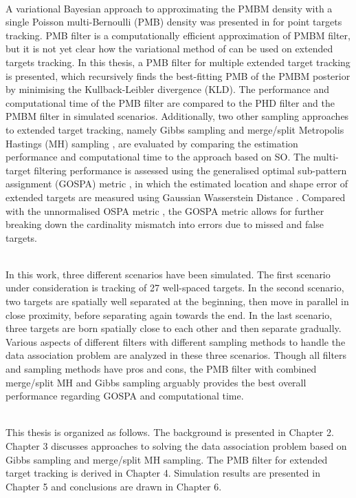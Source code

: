 ~\\
A variational Bayesian approach to approximating the PMBM density with a single Poisson multi-Bernoulli (PMB) density was presented in \cite{variational} for point targets tracking. PMB filter is a computationally efficient approximation of PMBM filter, but it is not yet clear how the variational method of \cite{variational} can be used on extended targets tracking. In this thesis, a PMB filter for multiple extended target tracking is presented, which recursively finds the best-fitting PMB of the PMBM posterior by minimising the Kullback-Leibler divergence (KLD). The performance and computational time of the PMB filter are compared to the PHD filter and the PMBM filter in simulated scenarios. Additionally, two other sampling approaches to extended target tracking, namely Gibbs sampling \cite{gibbs} and merge/split Metropolis Hastings (MH) sampling \cite{mergesplit}, are evaluated by comparing the estimation performance and computational time to the approach based on SO. The multi-target filtering performance is assessed using the generalised optimal sub-pattern assignment (GOSPA) metric \cite{gospa}, in which the estimated location and shape error of extended targets are measured using Gaussian Wasserstein Distance \cite{gwmetric}. Compared with the unnormalised OSPA metric \cite{ospa}, the GOSPA metric allows for further breaking down the cardinality mismatch into errors due to missed and false targets. 

~\\
In this work, three different scenarios have been simulated. The first scenario under consideration is tracking of 27 well-spaced targets. In the second scenario, two targets are spatially well separated at the beginning, then move in parallel in close proximity, before separating again towards the end. In the last scenario, three targets are born spatially close to each other and then separate gradually. Various aspects of different filters with different sampling methods to handle the data association problem are analyzed in these three scenarios. Though all filters and sampling methods have pros and cons, the PMB filter with combined merge/split MH and Gibbs sampling arguably provides the best overall performance regarding GOSPA and computational time. 

~\\
This thesis is organized as follows. The background is presented in Chapter 2. Chapter 3 discusses approaches to solving the data association problem based on Gibbs sampling and merge/split MH sampling. The PMB filter for extended target tracking is derived in Chapter 4. Simulation results are presented in Chapter 5 and conclusions are drawn in Chapter 6. 

